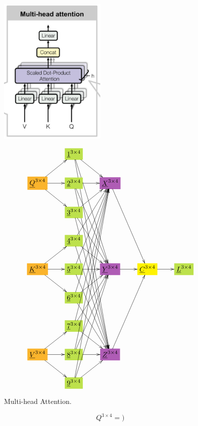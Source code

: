 \documentclass[12pt]{article}
\begin{document}
\begin{figure}[h!]\centering
\begin{minipage}{.5\linewidth}
\includegraphics[width=2in]{multi-head-att.jpg}
\end{minipage}%
\begin{minipage}{.5\linewidth}
$$\xymatrix{
&*+[F*:SpringGreen]{\underline{1}^{3\times  4}}\ar[dr]\ar[ddddr]\ar[dddddddr]&&&
\\
*+[F*:Dandelion]{\underline{Q}^{3\times  4}}\ar[ur]\ar[r]\ar[dr]&*+[F*:SpringGreen]{\underline{2}^{3\times  4}}\ar[r]\ar[dddr]\ar[ddddddr]&*+[F*:Orchid]{\underline{X}^{3\times  4}}\ar[dddr]&&
\\
&*+[F*:SpringGreen]{\underline{3}^{3\times  4}}\ar[ur]\ar[ddr]\ar[dddddr]&&&
\\
&*+[F*:SpringGreen]{\underline{4}^{3\times  4}}\ar[uur]\ar[dr]\ar[ddddr]&&&
\\
*+[F*:Dandelion]{\underline{K}^{3\times  4}}\ar[ur]\ar[r]\ar[dr]&*+[F*:SpringGreen]{\underline{5}^{3\times  4}}\ar[uuur]\ar[r]\ar[dddr]&*+[F*:Orchid]{\underline{Y}^{3\times  4}}\ar[r]&*+[F*:yellow]{\underline{C}^{3\times  4}}\ar[r]&*+[F*:SpringGreen]{\underline{L}^{3\times  4}}
\\
&*+[F*:SpringGreen]{\underline{6}^{3\times  4}}\ar[uuuur]\ar[ur]\ar[ddr]&&&
\\
&*+[F*:SpringGreen]{\underline{7}^{3\times  4}}\ar[uuuuur]\ar[uur]\ar[dr]&&&
\\
*+[F*:Dandelion]{\underline{V}^{3\times  4}}\ar[ur]\ar[r]\ar[dr]&*+[F*:SpringGreen]{\underline{8}^{3\times  4}}\ar[uuuuuur]\ar[uuur]\ar[r]&*+[F*:Orchid]{\underline{Z}^{3\times  4}}\ar[uuur]&&
\\
&*+[F*:SpringGreen]{\underline{9}^{3\times  4}}\ar[uuuuuuur]\ar[uuuur]\ar[ur]&&&
}$$
\end{minipage}
\caption{Multi-head Attention.}
\label{fig-texnn-for-multi-head-att}
\end{figure}\begin{subequations}
\begin{equation}
Q^{3\times  4} =)
\label{eq-Q-fun-multi-head-att}
\end{equation}


\end{subequations}
\end{document}
